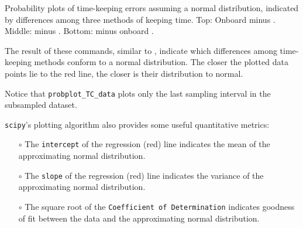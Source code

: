 \begin{enumerate}
\begin{marginfigure}[0.cm]
\begin{center}
		\caption[Probability plots of time-keeping errors]{Probability plots of time-keeping errors assuming a normal distribution, indicated by differences among three methods of keeping time.
			Top: Onboard \rtc minus  \rtc. Middle: \ntp minus  \rtc. Bottom: \ntp minus onboard \rtc. }
	\end{center}
\end{marginfigure}
	The result of these commands, similar to , indicate which differences among time-keeping methods conform to a normal distribution.
	The closer the plotted data points lie to the red line, the closer is their distribution to normal.
	
	\smallskip
	Notice that \lstinline{probplot_TC_data} plots only the last sampling interval in the subsampled dataset. 
	
	\smallskip
	\texttt{scipy}'s plotting algorithm also provides some useful quantitative metrics:
	\begin{itemize}
		\item[$\circ$] The \texttt{intercept} of the regression (red) line indicates the mean of the approximating normal distribution.
		\item[$\circ$] The \texttt{slope} of the regression (red) line indicates the variance of the approximating normal distribution.
		\item[$\circ$] The square root of the \texttt{Coefficient of Determination} indicates goodness of fit between the data and the approximating normal distribution.
	\end{itemize}
	

\end{enumerate}
